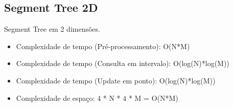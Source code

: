 \documentclass[11pt, a4paper, oneside]{book}
\begin{document}
\hfill

\subsection{Segment Tree 2D}


Segment Tree em 2 dimensões.



\begin{itemize}
\item Complexidade de tempo (Pré-processamento): O(N*M)
\item Complexidade de tempo (Consulta em intervalo): O(log(N)*log(M))
\item Complexidade de tempo (Update em ponto): O(log(N)*log(M))
\item Complexidade de espaço: 4 * N * 4 * M = O(N*M)
\end{itemize}

\hfill
\end{document}
